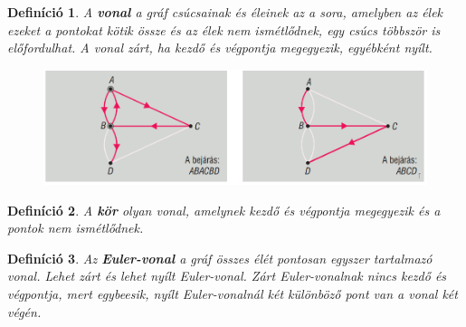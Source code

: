 \documentclass[12pt,a4paper]{article}
\newtheorem{definition}{Definíció} [section]
\begin{document}
\begin{definition}
A \textbf{vonal} a gráf csúcsainak és éleinek az a sora, amelyben az élek ezeket a pontokat kötik össze és az élek nem ismétlődnek, egy csúcs többször is előfordulhat. A vonal zárt, ha kezdő és végpontja megegyezik, egyébként nyílt.
\begin{figure}[h]
\centering
\includegraphics[scale=0.3]{geometry/graf_vonal}
\end{figure}
\end{definition}

\begin{definition}
A \textbf{kör} olyan vonal, amelynek kezdő és végpontja megegyezik és a pontok nem ismétlődnek.
\end{definition}

\begin{definition}
Az \textbf{Euler-vonal} a gráf összes élét pontosan egyszer tartalmazó vonal. Lehet zárt és lehet nyílt Euler-vonal. Zárt Euler-vonalnak nincs kezdő és végpontja, mert egybeesik, nyílt Euler-vonalnál két különböző pont van a vonal két végén.
\end{definition}
\end{document}
